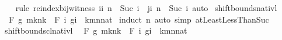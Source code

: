 \begin{isabellebody}
%
\isadelimproof
\ \ %
\endisadelimproof
%
\isatagproof
{}\isamarkupfalse%
\ {\isacharparenleft}{\kern0pt}rule\ reindex{\isacharunderscore}{\kern0pt}bij{\isacharunderscore}{\kern0pt}witness{\isacharbrackleft}{\kern0pt}\ i{\isacharequal}{\kern0pt}{\isachardoublequoteopen}{\isasymlambda}i{\isachardot}{\kern0pt}\ n\ {\isacharminus}{\kern0pt}\ Suc\ i{\isachardoublequoteclose}\ \ j{\isacharequal}{\kern0pt}{\isachardoublequoteopen}{\isasymlambda}i{\isachardot}{\kern0pt}\ n\ {\isacharminus}{\kern0pt}\ Suc\ i{\isachardoublequoteclose}{\isacharbrackright}{\kern0pt}{\isacharparenright}{\kern0pt}\ auto%
\endisatagproof
{\isafoldproof}%
%
\isadelimproof
\isanewline
%
\endisadelimproof
\isanewline
{}\isamarkupfalse%
\ shift{\isacharunderscore}{\kern0pt}bounds{\isacharunderscore}{\kern0pt}nat{\isacharunderscore}{\kern0pt}ivl{\isacharcolon}{\kern0pt}\isanewline
\ \ {\isachardoublequoteopen}F\ g\ {\isacharbraceleft}{\kern0pt}m{\isacharplus}{\kern0pt}k{\isachardot}{\kern0pt}{\isachardot}{\kern0pt}{\isacharless}{\kern0pt}n{\isacharplus}{\kern0pt}k{\isacharbraceright}{\kern0pt}\ {\isacharequal}{\kern0pt}\ F\ {\isacharparenleft}{\kern0pt}{\isasymlambda}i{\isachardot}{\kern0pt}\ g{\isacharparenleft}{\kern0pt}i\ {\isacharplus}{\kern0pt}\ k{\isacharparenright}{\kern0pt}{\isacharparenright}{\kern0pt}{\isacharbraceleft}{\kern0pt}m{\isachardot}{\kern0pt}{\isachardot}{\kern0pt}{\isacharless}{\kern0pt}n{\isacharcolon}{\kern0pt}{\isacharcolon}{\kern0pt}nat{\isacharbraceright}{\kern0pt}{\isachardoublequoteclose}\isanewline
%
\isadelimproof
%
\endisadelimproof
%
\isatagproof
{}\isamarkupfalse%
\ {\isacharparenleft}{\kern0pt}induct\ {\isachardoublequoteopen}n{\isachardoublequoteclose}{\isacharcomma}{\kern0pt}\ auto\ simp{\isacharcolon}{\kern0pt}\ atLeastLessThanSuc{\isacharparenright}{\kern0pt}%
\endisatagproof
{\isafoldproof}%
%
\isadelimproof
\isanewline
%
\endisadelimproof
\isanewline
{}\isamarkupfalse%
\ shift{\isacharunderscore}{\kern0pt}bounds{\isacharunderscore}{\kern0pt}cl{\isacharunderscore}{\kern0pt}nat{\isacharunderscore}{\kern0pt}ivl{\isacharcolon}{\kern0pt}\isanewline
\ \ {\isachardoublequoteopen}F\ g\ {\isacharbraceleft}{\kern0pt}m{\isacharplus}{\kern0pt}k{\isachardot}{\kern0pt}{\isachardot}{\kern0pt}n{\isacharplus}{\kern0pt}k{\isacharbraceright}{\kern0pt}\ {\isacharequal}{\kern0pt}\ F\ {\isacharparenleft}{\kern0pt}{\isasymlambda}i{\isachardot}{\kern0pt}\ g{\isacharparenleft}{\kern0pt}i\ {\isacharplus}{\kern0pt}\ k{\isacharparenright}{\kern0pt}{\isacharparenright}{\kern0pt}{\isacharbraceleft}{\kern0pt}m{\isachardot}{\kern0pt}{\isachardot}{\kern0pt}n{\isacharcolon}{\kern0pt}{\isacharcolon}{\kern0pt}nat{\isacharbraceright}{\kern0pt}{\isachardoublequoteclose}\isanewline

\end{isabellebody}
